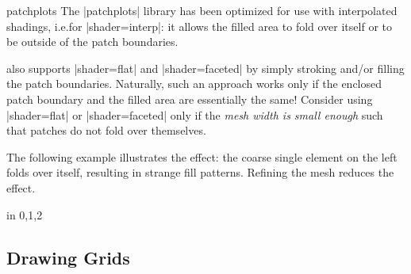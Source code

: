{\begin{pgfplotslibrary}{patchplots}
The |patchplots| library has been optimized for use with interpolated shadings,
i.e.\@ for |shader=interp|: it allows the filled area to fold over itself or to
be outside of the patch boundaries.

\PGFPlots{} also supports |shader=flat| and |shader=faceted| by simply stroking
and/or filling the patch boundaries. Naturally, such an approach works only if
the enclosed patch boundary and the filled area are essentially the same!
Consider using |shader=flat| or |shader=faceted| only if the \emph{mesh width
is small enough} such that patches do not fold over themselves.

The following example illustrates the effect: the coarse single element on the
left folds over itself, resulting in strange fill patterns. Refining the mesh
reduces the effect.
%
\begin{codeexample}[]
\foreach \level in {0,1,2} {%
}
\end{codeexample}


\subsection{Drawing Grids}
\label{sec:lib:patchplots:grids}


\end{pgfplotslibrary}}
